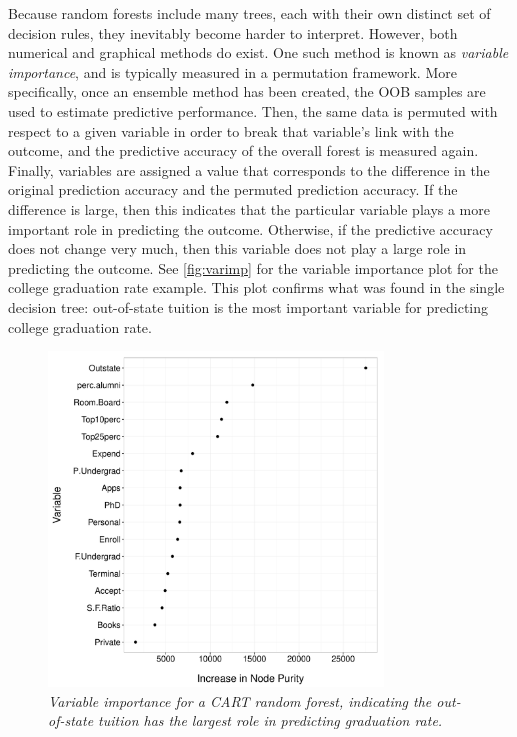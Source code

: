 	Because random forests include many trees, each with their own distinct set of decision rules, they inevitably become harder to interpret. However, both numerical and graphical methods do exist. One such method is known as \textit{variable importance}, and is typically measured in a permutation framework. More specifically, once an ensemble method has been created, the OOB samples are used to estimate predictive performance. Then, the same data is permuted with respect to a given variable in order to break that variable's link with the outcome, and the predictive accuracy of the overall forest is measured again. Finally, variables are assigned a value that corresponds to the difference in the original prediction accuracy and the permuted prediction accuracy. If the difference is large, then this indicates that the particular variable plays a more important role in predicting the outcome. Otherwise, if the predictive accuracy does not change very much, then this variable does not play a large role in predicting the outcome. See \autoref{fig:varimp} for the variable importance plot for the college graduation rate example. This plot confirms what was found in the single decision tree: out-of-state tuition is the most important variable for predicting college graduation rate.


\begin{figure}[h]
  \centering
  \includegraphics[width=3.5in]{Figures/Chapter02/var_imp_plot.pdf}
  \caption[Variable importance for a CART random forest.]{\textit{Variable importance for a CART random forest, indicating the out-of-state tuition has the largest role in predicting graduation rate.}}
  \label{fig:varimp}
\end{figure}


